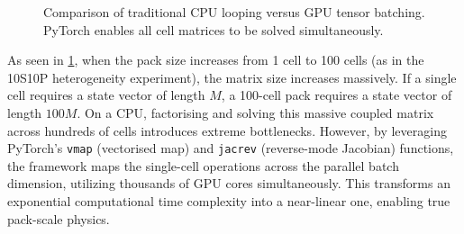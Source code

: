 \begin{figure}[H]
\centering
{}
\caption{Comparison of traditional CPU looping versus GPU tensor batching. PyTorch enables all cell matrices to be solved simultaneously.}
\label{fig:gpu_architecture}
\end{figure}

As seen in \cref{fig:gpu_architecture}, when the pack size increases from 1 cell to 100 cells (as in the 10S10P heterogeneity experiment), the matrix size increases massively. If a single cell requires a state vector of length $M$, a 100-cell pack requires a state vector of length $100M$. On a CPU, factorising and solving this massive coupled matrix across hundreds of cells introduces extreme bottlenecks. However, by leveraging PyTorch's \texttt{vmap} (vectorised map) and \texttt{jacrev} (reverse-mode Jacobian) functions, the framework maps the single-cell operations across the parallel batch dimension, utilizing thousands of GPU cores simultaneously. This transforms an exponential computational time complexity into a near-linear one, enabling true pack-scale physics.

